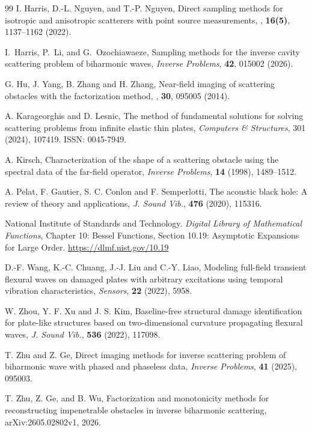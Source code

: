 \documentclass{article}
\begin{document}
\begin{thebibliography}{99}
\newblock I. Harris, D.-L. Nguyen, and T.-P. Nguyen,
\newblock Direct sampling methods for isotropic and anisotropic scatterers with point source measurements,
, {\bf 16(5)}, 1137--1162 (2022). 

I.~Harris, P.~Li, and G.~Ozochiawaeze,
Sampling methods for the inverse cavity scattering problem of biharmonic waves, {\it Inverse Problems}, \textbf{42}, 015002 (2026).

\newblock G. Hu, J. Yang, B. Zhang and H. Zhang,
\newblock Near-field imaging of scattering obstacles with the factorization method,
, {\bf 30}, 095005 (2014). 

A. Karageorghis and D. Lesnic,
The method of fundamental solutions for solving scattering problems from infinite elastic thin plates,
\textit{Computers \& Structures}, 301 (2024), 107419.
ISSN: 0045-7949.

A. Kirsch,
Characterization of the shape of a scattering obstacle using the spectral data of the far-field operator,
\textit{Inverse Problems}, \textbf{14} (1998), 1489--1512.

A. Pelat, F. Gautier, S. C. Conlon and F. Semperlotti,
The acoustic black hole: A review of theory and applications,
\textit{J. Sound Vib.}, \textbf{476} (2020), 115316.

National Institute of Standards and Technology. 
\newblock \textit{Digital Library of Mathematical Functions}, Chapter 10: Bessel Functions, Section 10.19: Asymptotic Expansions for Large Order.
\newblock \url{https://dlmf.nist.gov/10.19}


D.-F. Wang, K.-C. Chuang, J.-J. Liu and C.-Y. Liao,
Modeling full-field transient flexural waves on damaged plates with arbitrary excitations using temporal vibration characteristics,
\textit{Sensors}, \textbf{22} (2022), 5958.

W. Zhou, Y. F. Xu and J. S. Kim,
Baseline-free structural damage identification for plate-like structures based on two-dimensional curvature propagating flexural waves,
\textit{J. Sound Vib.}, \textbf{536} (2022), 117098.

T. Zhu and Z. Ge,
Direct imaging methods for inverse scattering problem of biharmonic wave with phased and phaseless data,
\textit{Inverse Problems}, \textbf{41} (2025), 095003.

T. Zhu, Z. Ge, and B. Wu,
Factorization and monotonicity methods for reconstructing impenetrable obstacles in inverse biharmonic scattering,
arXiv:2605.02802v1, 2026.

\end{thebibliography}
\end{document}
